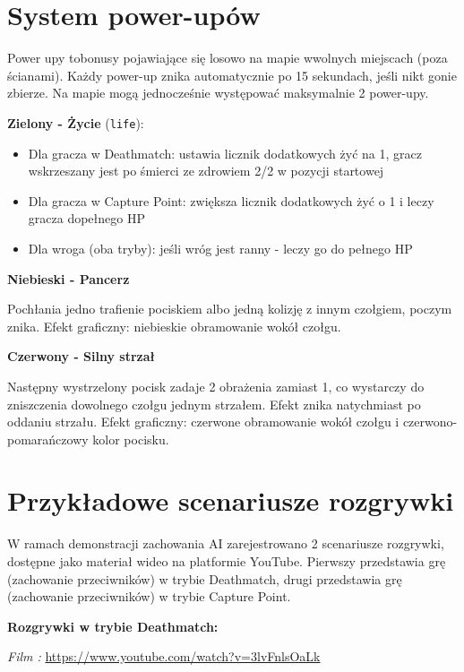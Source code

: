 \section{System power-upów}
 
Power upy tobonusy pojawiające się losowo na mapie wwolnych miejscach (poza ścianami). Każdy power-up 
znika automatycznie po 15 sekundach, jeśli nikt gonie zbierze. Na mapie mogą jednocześnie występować maksymalnie 2 power-upy.
 
\textbf{Zielony - Życie} (\texttt{life}):
\begin{itemize}
    \item Dla gracza w Deathmatch: ustawia licznik dodatkowych żyć na 1, gracz wskrzeszany jest po śmierci ze zdrowiem 2/2 
    w pozycji startowej
    \item Dla gracza w Capture Point: zwiększa licznik dodatkowych żyć o 1 i leczy gracza dopełnego HP
    \item Dla wroga (oba tryby): jeśli wróg jest ranny - leczy go do pełnego HP
\end{itemize}
 
\textbf{Niebieski - Pancerz} 

Pochłania jedno trafienie pociskiem albo jedną kolizję z innym czołgiem, poczym znika. 
Efekt graficzny: niebieskie obramowanie wokół czołgu.
 
\textbf{Czerwony - Silny strzał} 

Następny wystrzelony pocisk zadaje 2 obrażenia zamiast 1, co wystarczy do zniszczenia dowolnego czołgu 
jednym strzałem. Efekt znika natychmiast po oddaniu strzału. Efekt graficzny: 
czerwone obramowanie wokół czołgu i czerwono-pomarańczowy kolor pocisku.
 
\section{Przykładowe scenariusze rozgrywki}
 
W ramach demonstracji zachowania AI zarejestrowano 
2 scenariusze rozgrywki, dostępne jako materiał wideo na platformie YouTube.
Pierwszy przedstawia grę (zachowanie przeciwników) w trybie Deathmatch, drugi
przedstawia grę (zachowanie przeciwników) w trybie Capture Point.

\vspace{10pt}
\textbf{Rozgrywki w trybie Deathmatch:}

\textit{Film :} \href{https://www.youtube.com/watch?v=3lvFnlsOaLk}{https://www.youtube.com/watch?v=3lvFnlsOaLk}
 
